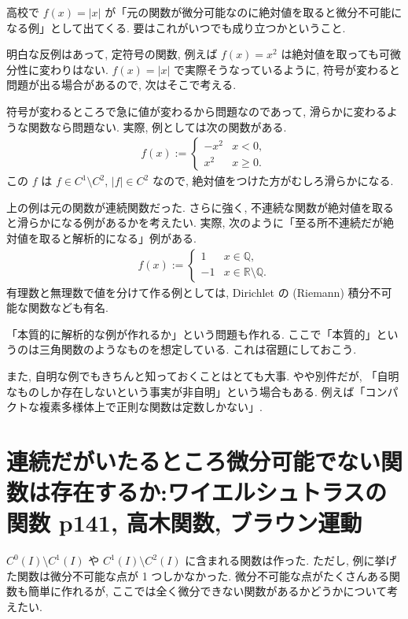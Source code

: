 \documentclass[openany, a4paper, oneside]{jsbook}
\begin{document}
高校で $f (x) = |x|$ が「元の関数が微分可能なのに絶対値を取ると微分不可能になる例」として出てくる.
要はこれがいつでも成り立つかということ.

明白な反例はあって, 定符号の関数, 例えば $f (x) = x^2$ は絶対値を取っても可微分性に変わりはない.
$f (x) = |x|$ で実際そうなっているように, 符号が変わると問題が出る場合があるので, 次はそこで考える.

符号が変わるところで急に値が変わるから問題なのであって, 滑らかに変わるような関数なら問題ない.
実際, 例としては次の関数がある.
\begin{align}
 f (x)
 :=
 \begin{cases}
  -x^2 & x < 0, \\
  x^2   & x \geq 0.
 \end{cases}
\end{align}
この $f$ は $f \in C^1 \setminus C^2$, $|f| \in C^2$ なので, 絶対値をつけた方がむしろ滑らかになる.

上の例は元の関数が連続関数だった.
さらに強く, 不連続な関数が絶対値を取ると滑らかになる例があるかを考えたい.
実際, 次のように「至る所不連続だが絶対値を取ると解析的になる」例がある.
\begin{align}
 f (x)
 :=
 \begin{cases}
  1  & x \in \mathbb{Q}, \\
  -1 & x \in \mathbb{R} \setminus \mathbb{Q}.
 \end{cases}
\end{align}
有理数と無理数で値を分けて作る例としては, Dirichlet の (Riemann) 積分不可能な関数なども有名.

「本質的に解析的な例が作れるか」という問題も作れる.
ここで「本質的」というのは三角関数のようなものを想定している.
これは宿題にしておこう.

また, 自明な例でもきちんと知っておくことはとても大事.
やや別件だが, 「自明なものしか存在しないという事実が非自明」という場合もある.
例えば「コンパクトな複素多様体上で正則な関数は定数しかない」.
\section{連続だがいたるところ微分可能でない関数は存在するか:ワイエルシュトラスの関数 \cite{WilliamDumham1} p141, 高木関数, ブラウン運動}

$C^0 (I) \setminus C^1 (I)$ や $C^1 (I) \setminus C^2 (I)$ に含まれる関数は作った.
ただし, 例に挙げた関数は微分不可能な点が 1 つしかなかった.
微分不可能な点がたくさんある関数も簡単に作れるが, ここでは全く微分できない関数があるかどうかについて考えたい.
\end{document}
